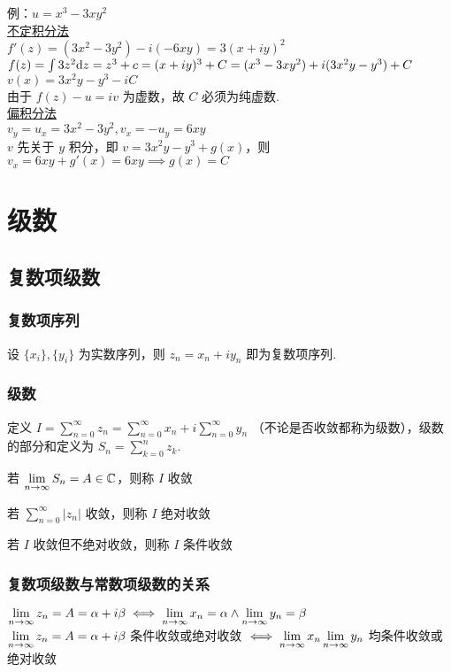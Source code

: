 \documentclass[./main.tex]{subfiles}
\begin{document}
\noindent 例：$u=x^3-3xy^2$\\
\noindent{}\underline{不定积分法}\\
$f'(z)=(3x^2-3y^2)-i(-6xy)=3(x+iy)^2$\\
$f(z)=\int 3z^2\text{d}z=z^3+c=(x+iy)^3+C=(x^3-3xy^2)+i(3x^2y-y^3)+C$\\
$v(x)=3x^2y-y^3-iC$\\
由于 $f(z)-u=iv$ 为虚数，故 $C$ 必须为纯虚数. \\
\noindent{}\underline{偏积分法}\\
$v_y=u_x=3x^2-3y^2,v_x=-u_y=6xy$\\
$v$ 先关于 $y$ 积分，即 $v=3x^2y-y^3+g(x)$，则 $v_x=6xy+g'(x)=6xy\implies g(x)=C$

\section{级数}
\subsection{复数项级数}
\subsubsection{复数项序列}
设 $\{x_i\},\{y_i\}$ 为实数序列，则 $z_n=x_n+iy_n$ 即为复数项序列. 
\subsubsection{级数}
定义 $I=\sum_{n=0}^{\infty}z_n=\sum_{n=0}^{\infty}x_n+i\sum_{n=0}^{\infty}y_n$ （不论是否收敛都称为级数），级数的部分和定义为 $S_n=\sum_{k=0}^{n}z_k$. 
\begin{enumerate*}
\item 若 $\lim\limits_{n\rightarrow\infty}S_n=A\in\mathbb{C}$，则称 $I$ 收敛
\item 若 $\sum_{n=0}^{\infty}|z_n|$ 收敛，则称 $I$ 绝对收敛
\item 若 $I$ 收敛但不绝对收敛，则称 $I$ 条件收敛
\end{enumerate*}
\subsubsection{复数项级数与常数项级数的关系}
$\lim\limits_{n\rightarrow\infty}z_n=A=\alpha+i\beta\iff \lim\limits_{n\rightarrow\infty} x_n=\alpha\wedge\lim\limits_{n\rightarrow\infty}y_n=\beta$\\
$\lim\limits_{n\rightarrow\infty}z_n=A=\alpha+i\beta$ 条件收敛或绝对收敛 $\iff \lim\limits_{n\rightarrow\infty} x_n \lim\limits_{n\rightarrow\infty}y_n$ 均条件收敛或绝对收敛
\end{document}
